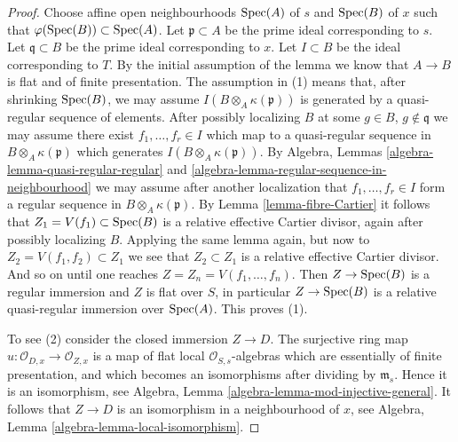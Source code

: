 \begin{proof}
Choose affine open neighbourhoods $\mathop{\mathrm{Spec}}(A)$ of $s$ and
$\mathop{\mathrm{Spec}}(B)$ of $x$ such that
$\varphi(\mathop{\mathrm{Spec}}(B)) \subset \mathop{\mathrm{Spec}}(A)$.
Let $\mathfrak p \subset A$ be the prime ideal corresponding to $s$.
Let $\mathfrak q \subset B$ be the prime ideal corresponding to $x$.
Let $I \subset B$ be the ideal corresponding to $T$.
By the initial assumption of the lemma we know that
$A \to B$ is flat and of finite presentation.
The assumption in (1) means that, after shrinking $\mathop{\mathrm{Spec}}(B)$, we may
assume $I(B \otimes_A \kappa(\mathfrak p))$ is generated by a
quasi-regular sequence of elements. After possibly localizing $B$
at some $g \in B$, $g \not \in \mathfrak q$ we may assume there
exist $f_1, \ldots, f_r \in I$ which map to a quasi-regular
sequence in $B \otimes_A \kappa(\mathfrak p)$ which generates
$I(B \otimes_A \kappa(\mathfrak p))$. By
Algebra, Lemmas \ref{algebra-lemma-quasi-regular-regular} and
\ref{algebra-lemma-regular-sequence-in-neighbourhood}
we may assume after another localization that
$f_1, \ldots, f_r \in I$ form a regular
sequence in $B \otimes_A \kappa(\mathfrak p)$. By
Lemma \ref{lemma-fibre-Cartier}
it follows that $Z_1 = V(f_1) \subset \mathop{\mathrm{Spec}}(B)$
is a relative effective Cartier divisor, again after possibly
localizing $B$. Applying the same lemma again, but now to
$Z_2 = V(f_1, f_2) \subset Z_1$ we see that $Z_2 \subset Z_1$
is a relative effective Cartier divisor. And so on until one
reaches $Z = Z_n = V(f_1, \ldots, f_n)$. Then
$Z \to \mathop{\mathrm{Spec}}(B)$ is a regular immersion and $Z$ is
flat over $S$, in particular $Z \to \mathop{\mathrm{Spec}}(B)$ is
a relative quasi-regular immersion over $\mathop{\mathrm{Spec}}(A)$.
This proves (1).

\medskip\noindent
To see (2) consider the closed immersion $Z \to D$. The surjective
ring map $u : \mathcal{O}_{D, x} \to \mathcal{O}_{Z, x}$
is a map of flat local $\mathcal{O}_{S, s}$-algebras which
are essentially of finite presentation, and which becomes an
isomorphisms after dividing by $\mathfrak m_s$. Hence it is
an isomorphism, see
Algebra, Lemma \ref{algebra-lemma-mod-injective-general}.
It follows that $Z \to D$ is an isomorphism in a neighbourhood
of $x$, see
Algebra, Lemma \ref{algebra-lemma-local-isomorphism}.


\end{proof}
